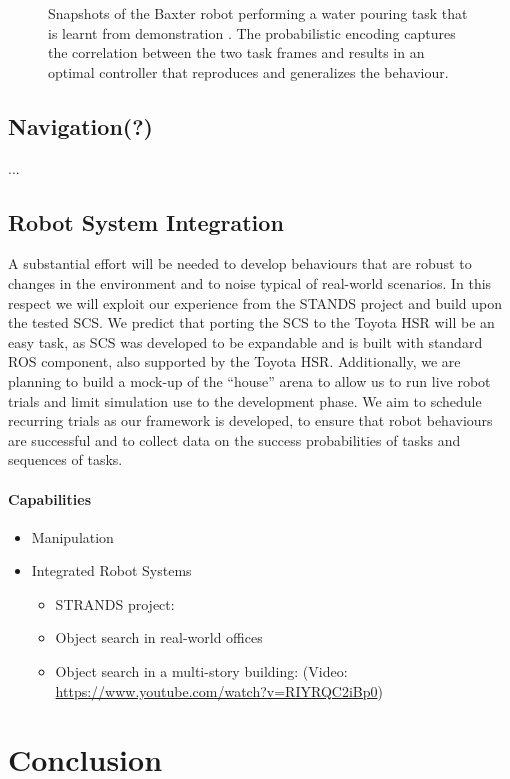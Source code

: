 \documentclass[runningheads,a4paper]{llncs}
\begin{document}
\begin{figure}[!tbh]
	\centering
	\caption{Snapshots of the Baxter robot performing a water pouring task that
	is learnt from demonstration \cite{Zeestraten2017-RAL}. The probabilistic
	encoding captures the correlation between the two task frames and results
	in an optimal controller that reproduces and generalizes the behaviour.}
	\label{fig:baxter_water_task}
\end{figure}

\subsection{Navigation(?)}
...

\subsection{Robot System Integration}
A substantial effort will be needed to develop behaviours that are robust to
changes in the environment and to noise typical of real-world scenarios. In this
respect we will exploit our experience from the STANDS project 
\cite{strands@ram} and build upon the tested SCS. We predict that porting the
SCS to the Toyota HSR will be an easy task, as SCS was developed to be 
expandable and is built with standard ROS component, also supported by the
Toyota HSR. Additionally, we are planning to build a mock-up of the ``house''
arena to
allow us to run live robot trials and limit simulation use to the development
phase. We aim to schedule recurring trials as our framework is developed, to
ensure that robot behaviours are successful and to collect data on the 
success probabilities of tasks and sequences of tasks.

\paragraph{Capabilities}
\begin{itemize}

    \item Manipulation
    \item Integrated Robot Systems
        \begin{itemize}
            \item STRANDS project: \cite{strands@ram}
            \item Object search in real-world offices \cite{kunze14indirect}
            \item Object search in a multi-story building: \cite{kunze12objsearch} (Video: \url{https://www.youtube.com/watch?v=RIYRQC2iBp0})

        \end{itemize}
\end{itemize}


\section{Conclusion}



\end{document}
